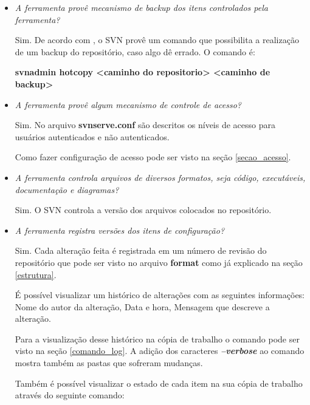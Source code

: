 \begin{itemize}
  \item \textit{A ferramenta provê mecanismo de backup dos itens controlados pela ferramenta?}

    Sim. De acordo com , o SVN provê um comando que possibilita a realização de um backup do repositório, caso algo dê errado. O comando é:

    \begin{centering}
    \colorbox{PineGreen}{
    \begin{minipage}{420px}
      \textbf{svnadmin hotcopy <caminho do repositorio> <caminho de backup>}
    \end{minipage}
    }

    \end{centering} 

  \item \textit{A ferramenta provê algum mecanismo de controle de acesso?}
   
    Sim. No arquivo \textbf{svnserve.conf} são descritos os níveis de acesso para usuários autenticados e não autenticados.\cite{svn-book}

    Como fazer configuração de acesso pode ser visto na seção \ref{secao_acesso}.
  \item \textit{A ferramenta controla arquivos de diversos formatos, seja código, executáveis, documentação e diagramas?}
    
    Sim. O SVN controla a versão dos arquivos colocados no repositório.

  \item \textit{A ferramenta registra versões dos itens de configuração?}
   
    Sim. Cada alteração feita é registrada em um número de revisão do repositório que pode ser visto no arquivo \textbf{format} como já explicado na seção \ref{estrutura}.

    É possível visualizar um histórico de alterações com as seguintes informações: Nome do autor da alteração, Data e hora, Mensagem que descreve a alteração. \cite{svn-book}

    Para a visualização desse histórico na cópia de trabalho o comando pode ser visto na seção \ref{comando_log}. A adição dos caracteres \textbf{\textit{--verbose}} ao comando mostra também as pastas que sofreram mudanças. 

    Também é possível visualizar o estado de cada item na sua cópia de trabalho através do seguinte comando: \cite{svn-book}


\end{itemize}
